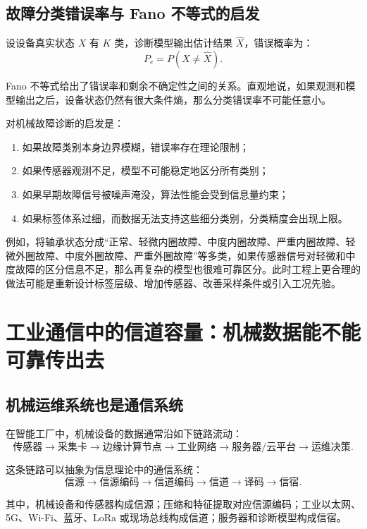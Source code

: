 \documentclass[UTF8,a4paper,12pt]{ctexart}
\begin{document}
\subsection{故障分类错误率与 Fano 不等式的启发}

设设备真实状态 $X$ 有 $K$ 类，诊断模型输出估计结果 $\hat X$，错误概率为：
\begin{equation}
P_e=P(X\ne \hat X).
\end{equation}

Fano 不等式给出了错误率和剩余不确定性之间的关系。直观地说，如果观测和模型输出之后，设备状态仍然有很大条件熵，那么分类错误率不可能任意小。

对机械故障诊断的启发是：
\begin{enumerate}
  \item 如果故障类别本身边界模糊，错误率存在理论限制；
  \item 如果传感器观测不足，模型不可能稳定地区分所有类别；
  \item 如果早期故障信号被噪声淹没，算法性能会受到信息量约束；
  \item 如果标签体系过细，而数据无法支持这些细分类别，分类精度会出现上限。
\end{enumerate}

例如，将轴承状态分成“正常、轻微内圈故障、中度内圈故障、严重内圈故障、轻微外圈故障、中度外圈故障、严重外圈故障”等多类，如果传感器信号对轻微和中度故障的区分信息不足，那么再复杂的模型也很难可靠区分。此时工程上更合理的做法可能是重新设计标签层级、增加传感器、改善采样条件或引入工况先验。

\section{工业通信中的信道容量：机械数据能不能可靠传出去}

\subsection{机械运维系统也是通信系统}

在智能工厂中，机械设备的数据通常沿如下链路流动：
\[
\text{传感器}\rightarrow \text{采集卡}\rightarrow \text{边缘计算节点}
\rightarrow \text{工业网络}\rightarrow \text{服务器/云平台}\rightarrow \text{运维决策}.
\]

这条链路可以抽象为信息理论中的通信系统：
\[
\text{信源}\rightarrow \text{信源编码}\rightarrow \text{信道编码}
\rightarrow \text{信道}\rightarrow \text{译码}\rightarrow \text{信宿}.
\]

其中，机械设备和传感器构成信源；压缩和特征提取对应信源编码；工业以太网、5G、Wi-Fi、蓝牙、LoRa 或现场总线构成信道；服务器和诊断模型构成信宿。
\end{document}
